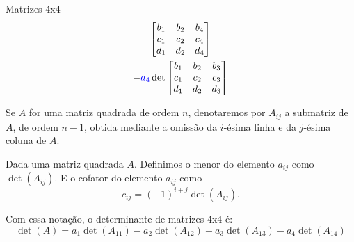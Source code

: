 \begin{frame}[label=determinantes]{Matrizes 4x4}
{\begin{multline*}
\begin{bmatrix}
{\color{black} b_{1}} &  {\color{black} b_{2}}  &  {\color{black} b_{4}}\\ 
{\color{black} c_{1}} &  {\color{black} c_{2}}  &  {\color{black} c_{4}}\\
{\color{black} d_{1}} &  {\color{black} d_{2}}  &  {\color{black} d_{4}}
\end{bmatrix}\\ 
-{\color{blue}a_4}\det
\begin{bmatrix}
{\color{black} b_{1}} &  {\color{black} b_{2}}  &  {\color{black} b_{3}}\\ 
{\color{black} c_{1}} &  {\color{black} c_{2}}  &  {\color{black} c_{3}}\\
{\color{black} d_{1}} &  {\color{black} d_{2}}  &  {\color{black} d_{3}}
\end{bmatrix}
\end{multline*}
}



\end{frame}


\begin{frame}[label=determinantes]
Se $A$ for uma matriz quadrada de ordem $n$, denotaremos por $A_{ij}$ a submatriz de $A$, de ordem $n-1$, obtida mediante a omissão da $i$-ésima linha e da $j$-ésima coluna de $A$.
\begin{defin}
Dada uma matriz quadrada $A$. Definimos o {\color{blue} menor do elemento $a_{ij}$} como $\det(A_{ij})$. E o {\color{blue} cofator do elemento $a_{ij}$} como 
\[c_{ij}=(-1)^{i+j}\det(A_{ij}).\]
\end{defin}
\begin{exe}
Com essa notação, o determinante de matrizes 4x4 é:
\[
\det(A)=a_1\det(A_{11})-a_2\det(A_{12})+a_3\det(A_{13})-a_4\det(A_{14})
\]
\end{exe}

\end{frame}

